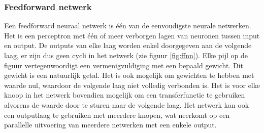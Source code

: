 \subsubsection{Feedforward netwerk}
\label{par:concept}
Een feedforward neuraal netwerk is \'e\'en van de eenvoudigste neurale netwerken. Het is een perceptron met \'e\'en of meer verborgen lagen van neuronen tussen input en output. De outputs van elke laag worden enkel doorgegeven aan de volgende laag, er zijn dus geen cycli in het netwerk (zie figuur \ref{fig:ffnn}). Elke pijl op de figuur vertegenwoordigt een vermenigvuldiging met een bepaald gewicht. Dit gewicht is een natuurlijk getal. Het is ook mogelijk om gewichten te hebben met waarde nul, waardoor de volgende laag niet volledig verbonden is. Het is voor elke knoop in het netwerk bovendien mogelijk om een transferfunctie te gebruiken alvorens de waarde door te sturen naar de volgende laag. Het netwerk kan ook een outputlaag te gebruiken met meerdere knopen, wat neerkomt op een parallelle uitvoering van meerdere netwerken met een enkele output\cite{Bishop:1995:NNP:525960}.

